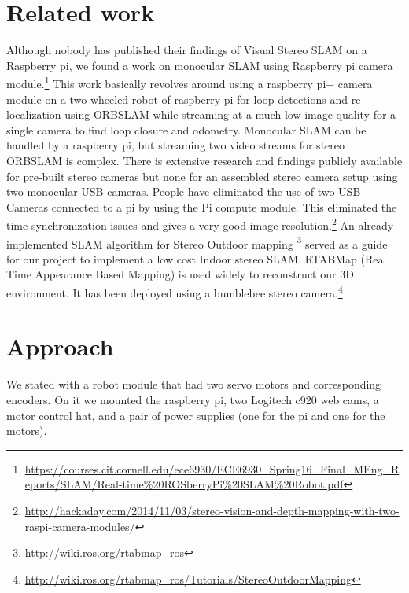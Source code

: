 \documentclass[10pt]{article}
\begin{document}
\section{Related work}
Although nobody has published their findings of Visual Stereo SLAM on a Raspberry pi, we found a work on monocular SLAM using Raspberry pi camera module.\footnote{\href{https://courses.cit.cornell.edu/ece6930/ECE6930\_Spring16\_Final\_MEng\_Reports/SLAM/Real-time\%20ROSberryPi\%20SLAM\%20Robot.pdf}{https://courses.cit.cornell.edu/ece6930/ECE6930\_Spring16\_Final\_MEng\_Reports/SLAM/Real-time\%20ROSberryPi\%20SLAM\%20Robot.pdf}}
This work basically revolves around using a raspberry pi+ camera module on a two wheeled robot of raspberry pi for loop detections and re-localization using ORBSLAM while streaming at a much low image quality for a single camera to find loop closure and odometry. Monocular SLAM can be handled by a raspberry pi, but streaming two video streams for stereo ORBSLAM is complex. There is extensive research and findings publicly available for pre-built stereo cameras but none for an assembled stereo camera setup using two monocular USB cameras. People have eliminated the use of two USB Cameras connected to a pi by using the Pi compute module. This eliminated the time synchronization issues and gives a very good image resolution.\footnote{\href{http://hackaday.com/2014/11/03/stereo-vision-and-depth-mapping-with-two-raspi-camera-modules/} {http://hackaday.com/2014/11/03/stereo-vision-and-depth-mapping-with-two-raspi-camera-modules/}} An already implemented SLAM algorithm for Stereo Outdoor mapping  \footnote{\href{http://wiki.ros.org/rtabmap\_ros}{http://wiki.ros.org/rtabmap\_ros}} served as a guide for our project to implement a low cost Indoor stereo SLAM. RTABMap (Real Time Appearance Based Mapping) is used widely to reconstruct our 3D environment. It has been deployed using a bumblebee stereo camera.\footnote{\href{http://wiki.ros.org/rtabmap\_ros/Tutorials/StereoOutdoorMapping}{http://wiki.ros.org/rtabmap\_ros/Tutorials/StereoOutdoorMapping}} 


\section{Approach}
We stated with a robot module that had two servo motors and corresponding encoders. On it we mounted the raspberry pi, two Logitech c920 web cams, a motor control hat, and a pair of power supplies (one for the pi and one for the motors). 
\end{document}
